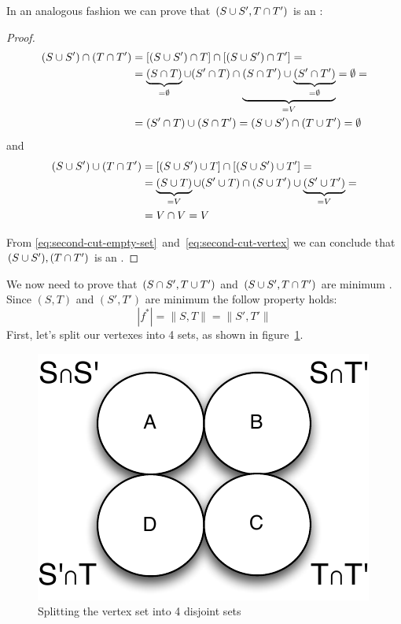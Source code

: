 In an analogous fashion we can prove that $(S \cup S', T \cap T')$ is an \stcut{}:
\begin{proof}
\begin{align}
(S \cup S') \cap (T \cap T') &= [(S \cup S') \cap T] \cap [(S \cup S') \cap T'] = \nonumber \\ 
&= \underbrace{(S \cap T)}_{=\emptyset} \cup (S' \cap T) \cap \underbrace{(S \cap T') \cup \underbrace{(S' \cap T')}_{=\emptyset}}_{=V} = \emptyset = \nonumber \\
&= (S' \cap T) \cup (S \cap T') = (S \cup S') \cap (T \cup T') = \emptyset \label{eq:second-cut-empty-set}
\end{align}
and
\begin{align}
(S \cup S') \cup (T \cap T') &= [(S \cup S') \cup T] \cap [(S \cup S') \cup T'] = \nonumber \\
&= \underbrace{(S \cup T)}_{=V} \cup (S' \cup T) \cap (S \cup T') \cup \underbrace{(S' \cup T')}_{=V} = \nonumber \\
&= V \cap V = V \label{eq:second-cut-vertex}
\end{align}

From \ref{eq:second-cut-empty-set}~and~\ref{eq:second-cut-vertex} we can conclude that $(S \cup S'), (T \cap T')$ is an \stcut{}.
\end{proof}

We now need to prove that $(S \cap S', T \cup T')$ and $(S \cup S', T \cap T')$ are minimum \stcuts{}.
Since $(S, T)$ and $(S', T')$ are minimum \stcuts{} the follow property holds:
\begin{equation}
| f^{*} | = \| S, T \| = \| S', T' \|
\label{eq:minimum-cuts}
\end{equation}
First, let's split our vertexes into 4 sets, as shown in figure~\ref{fig:problem2}. 

\begin{figure}[h!bt]
	\begin{center}
	\includegraphics{problem2}
	\end{center}
	\caption{Splitting the vertex set into 4 disjoint sets}
	\label{fig:problem2}
\end{figure}

